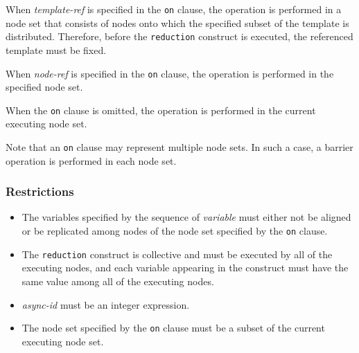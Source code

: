 When {\it template-ref} is specified in the {\tt on} clause, the operation
is performed in a node set that consists of nodes onto which the
specified subset of the template is distributed.
Therefore, before the {\tt reduction} construct is executed, the
referenced template must be fixed.
%
%

When {\it node-ref} is specified in the {\tt on} clause, the operation
is performed in the specified node set.

When the {\tt on} clause is omitted, the operation is performed in the
current executing node set.

Note that an {\tt on} clause may represent multiple node sets. In such a
case, a barrier operation is performed in each node set.

\subsubsection*{Restrictions}

\begin{itemize}
 \item The variables specified by the sequence of {\it variable} must
       either not be aligned or be replicated among nodes of the node
       set specified by the {\tt on} clause.
 \item The {\tt reduction} construct is collective and must be
       executed by all of the executing nodes, and each variable
       appearing in the construct must have the same value among all of
       the executing nodes.
 \item {\it async-id} must be an integer expression.
 \item The node set specified by the {\tt on} clause must be a subset of the
       current executing node set.
\end{itemize}

